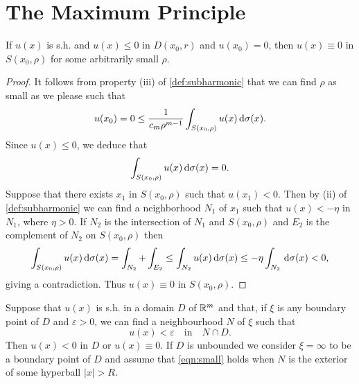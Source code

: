 \section{The Maximum Principle}

\begin{lemma}\label{lma:2-1}
	If $u(x)$ is s.h.  and $u(x)\le 0$ in $D(x_0,r)$ and $u(x_0)=0$, then $u(x)\equiv 0$ in $S(x_0,\rho)$ for some arbitrarily small $\rho$.
\end{lemma}
\begin{proof}
	It follows from property (iii) of \cref{def:subharmonic} that we can find $\rho$ as small as we please such that 
	 \[
	u(x_0)=0\le \frac{1}{c_m\rho^{m-1}}\int_{S(x_0,\rho)}u(x)\,\mathrm{d} \sigma(x).
	\] Since $u(x)\le 0$, we deduce that
	\[
	\int_{S(x_0,\rho)}u(x)\,\mathrm{d} \sigma(x)=0.
\] Suppose that there exists $x_1$ in $S(x_0,\rho)$ such that $u(x_1)<0$. Then by (ii) of \cref{def:subharmonic} we can find a neighborhood $N_1$ of $x_1$ such that $u(x)<-\eta $ in $N_1$, where $\eta>0$. If $N_2$ is the intersection of $N_1$ and $S(x_0,\rho)$ and $E_2$ is the complement of $N_2$ on $S(x_0,\rho)$ then
\[
\int_{S(x_0,\rho)}u(x)\,\mathrm{d} \sigma(x)=\int_{N_2}+\int_{E_2}\le \int_{N_2}u(x)\,\mathrm{d} \sigma(x)\le -\eta\int_{N_2}\,\mathrm{d} \sigma(x)<0,
\] giving a contradiction. Thus $u(x)\equiv 0$ in $S(x_0,\rho)$.
\end{proof}

\begin{theorem}
	Suppose that $u(x)$ is s.h. in a domain $D$ of $\mathbb{R}^{m}$ and that, if $\xi$ is any boundary point of $D$ and $\varepsilon >0$, we can find a neighbourhood $N$ of $\xi$ such that 
	\begin{equation}\label{eqn:small}
		u(x)<\varepsilon  \quad \text{in}\quad N \cap D.
	\end{equation}
	Then $u(x)<0$ in $D$ or $u(x)\equiv 0$. If $D$ is unbounded we consider $\xi=\infty$ to be a boundary point of $D$ and assume that \cref{eqn:small} holds when $N$ is the exterior of some hyperball $|x|>R$. 
\end{theorem}

